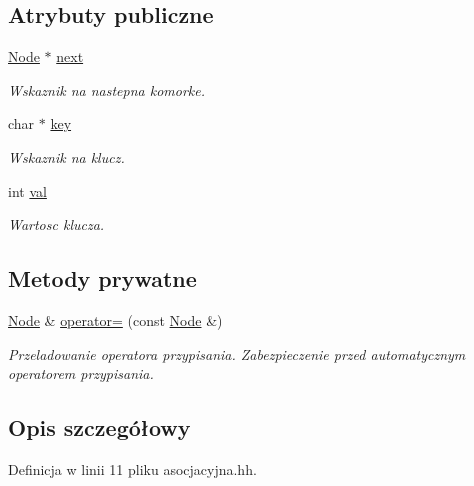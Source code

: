 \subsection*{Atrybuty publiczne}
\begin{DoxyCompactItemize}
\item 
\hyperlink{struct_node}{Node} $\ast$ \hyperlink{struct_node_a2559a716f69ccaa76d648d9f1b83065e}{next}
\begin{DoxyCompactList}\small\item\em Wskaznik na nastepna komorke. \end{DoxyCompactList}\item 
char $\ast$ \hyperlink{struct_node_ad88c9a757bfafd5ff265e0837b150056}{key}
\begin{DoxyCompactList}\small\item\em Wskaznik na klucz. \end{DoxyCompactList}\item 
int \hyperlink{struct_node_ab1d228a881cf7465b2d42ea135781427}{val}
\begin{DoxyCompactList}\small\item\em Wartosc klucza. \end{DoxyCompactList}\end{DoxyCompactItemize}
\subsection*{Metody prywatne}
\begin{DoxyCompactItemize}
\item 
\hyperlink{struct_node}{Node} \& \hyperlink{struct_node_a90ff04ae049a62fa2c39771ef89398a5}{operator=} (const \hyperlink{struct_node}{Node} \&)
\begin{DoxyCompactList}\small\item\em Przeladowanie operatora przypisania. Zabezpieczenie przed automatycznym operatorem przypisania. \end{DoxyCompactList}\end{DoxyCompactItemize}


\subsection{Opis szczegółowy}


Definicja w linii 11 pliku asocjacyjna.\-hh.



